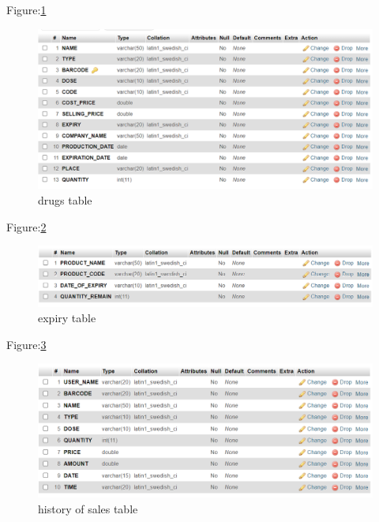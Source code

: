 \documentclass[12pt, letter paper]{report}
\begin{document}
\begin{center}
	Figure:\ref{fig:drugs.png} 
	\begin{figure}[h]
		\centering
		\includegraphics[width=1\textwidth]{drugs.png}
		\caption{drugs table}
		\label{fig:drugs.png}
	\end{figure}
\end{center}

\begin{center}
	Figure:\ref{fig:expiry.png}
	\begin{figure}[h]
		\centering
		\includegraphics[width=1\textwidth]{expiry.png}
		\caption{expiry table}
		\label{fig:expiry.png}
	\end{figure}
\end{center}
\newpage
\begin{center}
	Figure:\ref{fig:history.png}
	\begin{figure}[h]
		\centering
		\includegraphics[width=1\textwidth]{history.png}
		\caption{history of sales table}
		\label{fig:history.png}
	\end{figure}
\end{center}
\end{document}
